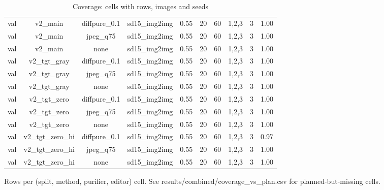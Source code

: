 \begin{table}[t]
{\begin{tabular}{lccccccccc}
val & v2\_main & diffpure\_0.1 & sd15\_img2img & 0.55 & 20 & 60 & 1,2,3 & 3 & 1.00 \\
val & v2\_main & jpeg\_q75 & sd15\_img2img & 0.55 & 20 & 60 & 1,2,3 & 3 & 1.00 \\
val & v2\_main & none & sd15\_img2img & 0.55 & 20 & 60 & 1,2,3 & 3 & 1.00 \\
val & v2\_tgt\_gray & diffpure\_0.1 & sd15\_img2img & 0.55 & 20 & 60 & 1,2,3 & 3 & 1.00 \\
val & v2\_tgt\_gray & jpeg\_q75 & sd15\_img2img & 0.55 & 20 & 60 & 1,2,3 & 3 & 1.00 \\
val & v2\_tgt\_gray & none & sd15\_img2img & 0.55 & 20 & 60 & 1,2,3 & 3 & 1.00 \\
val & v2\_tgt\_zero & diffpure\_0.1 & sd15\_img2img & 0.55 & 20 & 60 & 1,2,3 & 3 & 1.00 \\
val & v2\_tgt\_zero & jpeg\_q75 & sd15\_img2img & 0.55 & 20 & 60 & 1,2,3 & 3 & 1.00 \\
val & v2\_tgt\_zero & none & sd15\_img2img & 0.55 & 20 & 60 & 1,2,3 & 3 & 1.00 \\
val & v2\_tgt\_zero\_hi & diffpure\_0.1 & sd15\_img2img & 0.55 & 20 & 60 & 1,2,3 & 3 & 0.97 \\
val & v2\_tgt\_zero\_hi & jpeg\_q75 & sd15\_img2img & 0.55 & 20 & 60 & 1,2,3 & 3 & 1.00 \\
val & v2\_tgt\_zero\_hi & none & sd15\_img2img & 0.55 & 20 & 60 & 1,2,3 & 3 & 1.00 \\
\bottomrule
\end{tabular}
}
\caption{Coverage: cells with rows, images and seeds}
\label{tab:coverage}
\par\footnotesize Rows per (split, method, purifier, editor) cell. See results/combined/coverage\_vs\_plan.csv for planned-but-missing cells.
\end{table}

